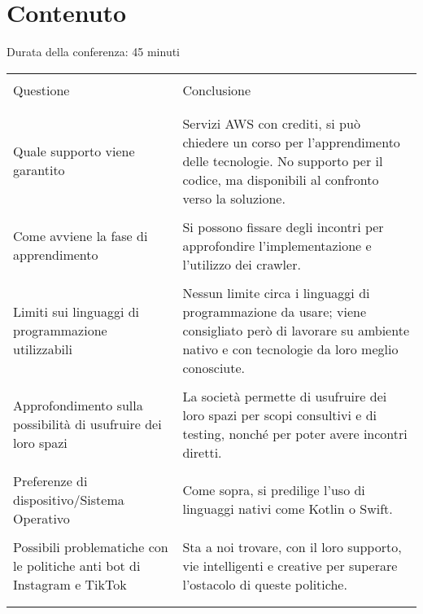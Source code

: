 \section{Contenuto}
Durata della conferenza: 45 minuti
\newline
\begin{longtable}{|p{7cm}|p{8cm}|}
    \hline
    & \\
    Questione & Conclusione\\
    & \\
    \hline
    & \\

    Quale supporto viene garantito
    &
    Servizi AWS con crediti, si può chiedere un
    corso per l’apprendimento delle tecnologie. No
    supporto per il codice, ma disponibili al
    confronto verso la soluzione.\\

    & \\

    Come avviene la fase di apprendimento
    &
    Si possono fissare degli incontri per
    approfondire l'implementazione e l'utilizzo dei
    crawler.\\

    & \\

    Limiti sui linguaggi di programmazione
    utilizzabili
    &
    Nessun limite circa i linguaggi di
    programmazione da usare; viene consigliato
    però di lavorare su ambiente nativo e con
    tecnologie da loro meglio conosciute.\\

    & \\

    Approfondimento sulla possibilità di usufruire
    dei loro spazi     
    &
    La società permette di usufruire dei loro spazi
    per scopi consultivi e di testing, nonché per
    poter avere incontri diretti.\\

    & \\

    Preferenze di dispositivo/Sistema
    Operativo
    &
    Come sopra, si predilige l'uso di linguaggi nativi
    come Kotlin o Swift.\\

    & \\

    Possibili problematiche con le politiche anti bot
    di Instagram e TikTok 
    &
    Sta a noi trovare, con il loro supporto, vie
    intelligenti e creative per superare l'ostacolo di
    queste politiche.\\
    & \\
    \hline
    & \\
    

\end{longtable}
